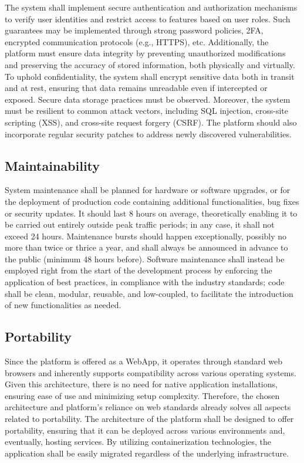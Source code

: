 The system shall implement secure authentication and authorization mechanisms to verify user identities and restrict access to features based on user roles. Such guarantees may be implemented through strong password policies, 2FA, encrypted communication protocols (e.g., HTTPS), etc.
Additionally, the platform must ensure data integrity by preventing unauthorized modifications and preserving the accuracy of stored information, both physically and virtually.
To uphold confidentiality, the system shall encrypt sensitive data both in transit and at rest, ensuring that data remains unreadable even if intercepted or exposed. Secure data storage practices must be observed.
Moreover, the system must be resilient to common attack vectors, including SQL injection, cross-site scripting (XSS), and cross-site request forgery (CSRF). The platform should also incorporate regular security patches to address newly discovered vulnerabilities.

\subsection{Maintainability}
\label{sec:maintainability}%

System maintenance shall be planned for hardware or software upgrades, or for the deployment of production code containing additional functionalities, bug fixes or security updates. 
It should last 8 hours on average, theoretically enabling it to be carried out entirely outside peak traffic periods; in any case, it shall not exceed 24 hours. 
Maintenance bursts should happen exceptionally, possibly no more than twice or thrice a year, and shall always be announced in advance to the public (minimum 48 hours before). 
Software maintenance shall instead be employed right from the start of the development process by enforcing the application of best practices, in compliance with the industry standards; code shall be clean, modular, reusable, and low-coupled, to facilitate the introduction of new functionalities as needed.

\subsection{Portability}
\label{sec:portability}%

Since the platform is offered as a WebApp, it operates through standard web browsers and inherently supports compatibility across various operating systems.
Given this architecture, there is no need for native application installations, ensuring ease of use and minimizing setup complexity. Therefore, the chosen architecture and platform's reliance on web standards already solves all aspects related to portability.
The architecture of the platform shall be designed to offer portability, ensuring that it can be deployed across various environments and, eventually, hosting services. By utilizing containerization technologies, the application shall be easily migrated regardless of the underlying infrastructure.
